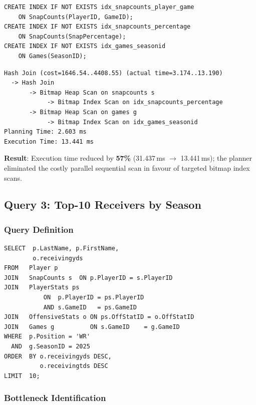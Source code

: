 \documentclass[conference]{IEEEtran}
\begin{document}
\begin{lstlisting}[style=sqlstyle, caption={Index creation -- Query 2}]
CREATE INDEX IF NOT EXISTS idx_snapcounts_player_game
    ON SnapCounts(PlayerID, GameID);
CREATE INDEX IF NOT EXISTS idx_snapcounts_percentage
    ON SnapCounts(SnapPercentage);
CREATE INDEX IF NOT EXISTS idx_games_seasonid
    ON Games(SeasonID);
\end{lstlisting}

\begin{lstlisting}[style=planstyle, caption={Optimized plan -- Query 2 (after index)}]
Hash Join (cost=1646.54..4408.55) (actual time=3.174..13.190)
  -> Hash Join
       -> Bitmap Heap Scan on snapcounts s
            -> Bitmap Index Scan on idx_snapcounts_percentage
       -> Bitmap Heap Scan on games g
            -> Bitmap Index Scan on idx_games_seasonid
Planning Time: 2.603 ms
Execution Time: 13.441 ms
\end{lstlisting}

\textbf{Result}: Execution time reduced by \textbf{57\%} (31.437\,ms $\rightarrow$ 13.441\,ms); the planner eliminated the costly parallel sequential scan in favour of targeted bitmap index scans.

\subsection{Query 3: Top-10 Receivers by Season}

\subsubsection{Query Definition}

\begin{lstlisting}[style=sqlstyle, caption={Top-10 WR query by season}]
SELECT  p.LastName, p.FirstName,
        o.receivingyds
FROM   Player p
JOIN   SnapCounts s  ON p.PlayerID = s.PlayerID
JOIN   PlayerStats ps
           ON  p.PlayerID = ps.PlayerID
           AND s.GameID   = ps.GameID
JOIN   OffensiveStats o ON ps.OffStatID = o.OffStatID
JOIN   Games g          ON s.GameID    = g.GameID
WHERE  p.Position = 'WR'
  AND  g.SeasonID = 2025
ORDER  BY o.receivingyds DESC,
          o.receivingtds DESC
LIMIT  10;
\end{lstlisting}

\subsubsection{Bottleneck Identification}
\end{document}
